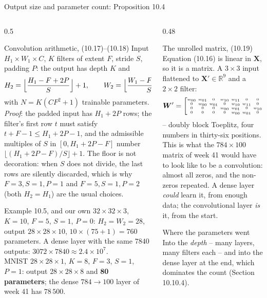 \documentclass[10pt,aspectratio=169]{beamer}
\begin{document}
\begin{frame}{Output size and parameter count: Proposition 10.4}
\small
\begin{columns}[T]
\begin{column}{0.5\textwidth}
\begin{block}{Convolution arithmetic, (10.17)--(10.18)}
\scriptsize
Input $H_1\times W_1\times C$, $K$ filters of extent $F$, stride $S$,
padding $P$: the output has depth $K$ and
\[
  H_2=\Bigl\lfloor\frac{H_1-F+2P}{S}\Bigr\rfloor+1,\qquad
  W_2=\Bigl\lfloor\frac{W_1-F+2P}{S}\Bigr\rfloor+1,
\]
with $N=K(CF^{2}+1)$ trainable parameters.  \emph{Proof}: the padded input
has $H_1+2P$ rows; the filter's first row $t$ must satisfy
$t+F-1\le H_1+2P-1$, and the admissible multiples of $S$ in
$[0,H_1+2P-F]$ number $\lfloor(H_1+2P-F)/S\rfloor+1$.  The floor is not
decoration: when $S$ does not divide, the last rows are silently
discarded, which is why $F=3,S=1,P=1$ and $F=5,S=1,P=2$ (both
$H_2=H_1$) are the usual choices.
\end{block}
\begin{block}{Example 10.5, and our own}
\scriptsize
$32\times32\times3$, $K=10$, $F=5$, $S=1$, $P=0$: $H_2=W_2=28$, output
$28\times28\times10$, $10\times(75+1)=760$ parameters.  A dense layer with
the same $7840$ outputs: $3072\times7840\approx2.4\times10^{7}$.\\[2pt]
MNIST $28\times28\times1$, $K=8$, $F=3$, $S=1$, $P=1$: output
$28\times28\times8$ and \textbf{80 parameters}; the dense $784\to100$ layer
of week 41 has $78\,500$.
\end{block}
\end{column}
\begin{column}{0.48\textwidth}
\begin{block}{The unrolled matrix, (10.19)}
\scriptsize
Equation (10.16) is linear in $\bm{X}$, so it is a matrix.  A $3\times3$
input flattened to $\bm{X}'\in\mathbb{R}^{9}$ and a $2\times2$ filter:
\[
  \setlength{\arraycolsep}{1.5pt}
  \bm{W}'=
  {\tiny
  \begin{bmatrix}
    w_{00}&w_{01}&0&w_{10}&w_{11}&0&0&0&0\\
    0&w_{00}&w_{01}&0&w_{10}&w_{11}&0&0&0\\
    0&0&0&w_{00}&w_{01}&0&w_{10}&w_{11}&0\\
    0&0&0&0&w_{00}&w_{01}&0&w_{10}&w_{11}
  \end{bmatrix}}
\]
-- doubly block Toeplitz, four numbers in thirty-six positions.  This is
what the $784\times100$ matrix of week 41 would have to look like to be a
convolution: almost all zeros, and the non-zeros repeated.  A dense layer
\emph{could} learn it, from enough data; the convolutional layer
\emph{is} it, from the start.
\end{block}
\begin{block}{Where the parameters went}
\scriptsize
Into the \emph{depth} -- many layers, many filters each -- and into the
dense layer at the end, which dominates the count (Section 10.10.4).
\end{block}
\end{column}
\end{columns}
\end{frame}
\end{document}
